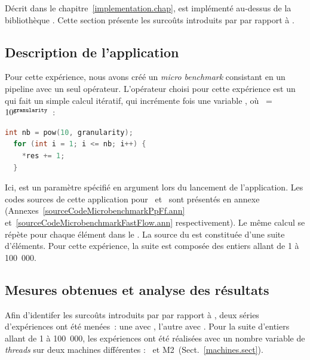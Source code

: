 
D\'ecrit dans le chapitre~\ref{implementation.chap},  est impl\'ement\'e au-dessus de la biblioth\`eque . Cette section pr\'esente les surco\^uts introduits par  par rapport \`a . 


\subsection{Description de l'application}

Pour cette exp\'erience, nous avons cr\'e\'e un \emph{micro benchmark} consistant en un {pipeline} avec un seul op\'erateur. L'op\'erateur choisi pour cette exp\'erience est un  qui fait un simple calcul it\'eratif, qui incr\'emente   fois une variable , o\`u ~=~$10^{{\tt granularity}}$~:
{
\begin{lstlisting}[language=c++]
  int nb = pow(10, granularity);
  for (int i = 1; i <= nb; i++) {
    *res += 1;   
  }
\end{lstlisting}
} 

Ici,  est un param\`etre sp\'ecifi\'e en argument lors du lancement de l'application. Les codes sources de cette application pour~ et~ sont pr\'esent\'es en annexe (Annexes~\ref{sourceCodeMicrobenchmarkPpFf.ann} et~\ref{sourceCodeMicrobenchmarkFastFlow.ann} respectivement). Le m\^eme calcul se r\'ep\`ete pour chaque \'el\'ement dans le . La source du  est constitu\'ee d'une suite d'\'el\'ements. Pour cette exp\'erience, la suite est compos\'ee des entiers allant de 1 \`a 100~000.  


\subsection{Mesures obtenues et analyse des r\'esultats}

Afin d'identifer les surco\^uts introduits par \PpFf{} par rapport \`a , deux s\'eries d'exp\'eriences ont \'et\'e men\'ees~: une avec , l'autre avec . Pour la suite d'entiers allant de 1 \`a 100~000, les exp\'eriences ont \'et\'e r\'ealis\'ees avec un nombre variable de \emph{threads} sur deux machines diff\'erentes : \ et M2\ (Sect.~\ref{machines.sect}).  

